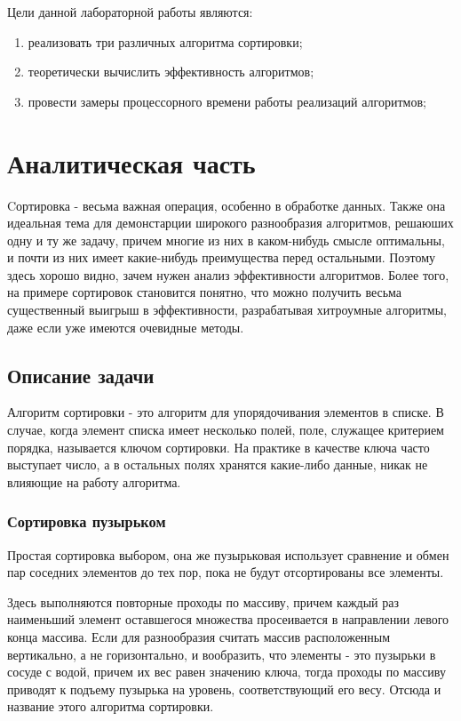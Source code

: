 \documentclass[a4paper]{article}
\begin{document}
	
	Цели данной лабораторной работы являются:
	\begin{enumerate}
		\item реализовать три различных алгоритма сортировки;
		\item теоретически вычислить эффективность алгоритмов;
		\item провести замеры процессорного времени работы реализаций алгоритмов;
	\end{enumerate}
	\clearpage
	
	\section{Аналитическая часть}
	Cортировка - весьма важная операция, особенно в обработке данных. Также она идеальная тема для демонстарции широкого разнообразия алгоритмов, решаюших одну и ту же задачу, причем многие из них в каком-нибудь смысле оптимальны, и почти из них имеет какие-нибудь преимущества перед остальными. Поэтому здесь хорошо видно, зачем нужен анализ эффективности алгоритмов. Более того, на примере сортировок становится понятно, что можно получить весьма существенный выигрыш в эффективности, разрабатывая хитроумные алгоритмы, даже если уже имеются очевидные методы.
	
	\subsection{Описание задачи}
	Алгоритм сортировки - это алгоритм для упорядочивания элементов в списке. В случае, когда элемент списка имеет несколько полей, поле, служащее критерием порядка, называется ключом сортировки. На практике в качестве ключа часто выступает число, а в остальных полях хранятся какие-либо данные, никак не влияющие на работу алгоритма.
	
	\subsubsection{Сортировка пузырьком}
	Простая сортировка выбором, она же пузырьковая использует сравнение и обмен пар соседних элементов до тех пор, пока не будут отсортированы все элементы.
	
	Здесь выполняются повторные проходы по массиву, причем каждый раз наименьший элемент оставшегося множества просеивается в направлении левого конца массива. Если для разнообразия считать массив расположенным вертикально, а не горизонтально, и вообразить, что элементы - это пузырьки в сосуде с водой, причем их вес равен значению ключа, тогда проходы по массиву приводят к подъему пузырька на уровень, соответствующий его весу. Отсюда и название этого алгоритма сортировки.
	
\end{document}
